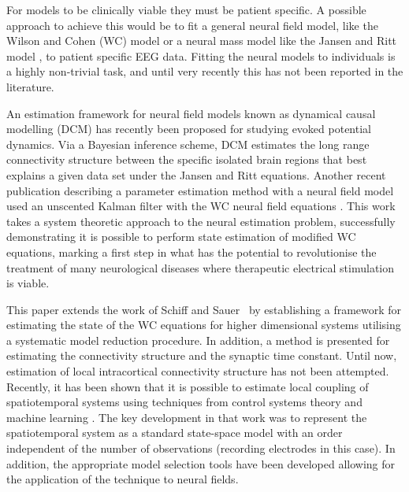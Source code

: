 \documentclass[twocolumn,11pt,a4paper]{article}		%
\begin{document}
For models to be clinically viable they must be patient specific. A possible approach to achieve this would be to fit a general neural field model, like the Wilson and Cohen (WC) \cite{Wilson1973} model or a neural mass model like the Jansen and Ritt model \cite{Jansen1995}, to patient specific EEG data. Fitting the neural models to individuals is a highly non-trivial task, and until very recently this has not been reported in the literature. 

An estimation framework for neural field models known as dynamical causal modelling (DCM) \cite{David2003,David2006} has recently been proposed for studying evoked potential dynamics. Via a Bayesian inference scheme, DCM estimates the long range connectivity structure between the specific isolated brain regions that best explains a given data set under the Jansen and Ritt equations. Another recent publication describing a parameter estimation method with a neural field model used an unscented Kalman filter with the WC neural field equations \cite{schiff2008kalman}. This work takes a system theoretic approach to the neural estimation problem, successfully demonstrating it is possible to perform state estimation of modified WC equations, marking a first step in what has the potential to revolutionise the treatment of many neurological diseases where therapeutic electrical stimulation is viable.


This paper extends the work of Schiff and Sauer~\cite{schiff2008kalman} by establishing a framework for estimating the state of the WC equations for higher dimensional systems utilising a systematic model reduction procedure. In addition, a method is presented for estimating the connectivity structure and the synaptic time constant. Until now, estimation of local intracortical connectivity structure has not been attempted. Recently, it has been shown that it is possible to estimate local coupling of spatiotemporal systems using techniques from control systems theory and machine learning \cite{Dewar2009}. The key development in that work was to represent the spatiotemporal system as a standard state-space model with an order independent of the number of observations (recording electrodes in this case). In addition, the appropriate model selection tools have been developed \cite{Scerri2009} allowing for the application of the technique to neural fields. 
\end{document}
